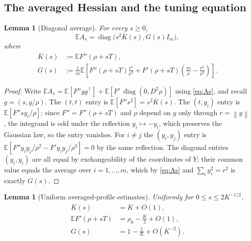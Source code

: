 \documentclass[11pt]{article}
\theoremstyle{plain}
\newtheorem{lemma}[theorem]{Lemma}
\theoremstyle{definition}
\theoremstyle{remark}
\newcommand{\E}{\mathbb{E}}
\newcommand{\diag}{\operatorname{diag}}
\newcommand{\Id}{I}
\newcommand{\1}{\mathbf{1}}
\newcommand{\norm}[1]{\left\lVert #1\right\rVert}
\begin{document}
\subsection{The averaged Hessian and the tuning equation}

\begin{lemma}[Diagonal average]
\label{lem:mean-As}
For every $s\geq0$,
\begin{equation}
    \E A_s
    =
    \diag\bigl(s^2\overline K(s),G(s)\Id_m\bigr),
    \label{eq:mean-As}
\end{equation}
where
\begin{align}
    \overline K(s)
    &:=
    \E F''(\rho+sT),
    \label{eq:barK}\\
    G(s)
    &:=
    \frac1m
    \E\!\left[
        F''(\rho+sT)\frac{r^2}{\rho^2}
        +
        F'(\rho+sT)
        \left(
            \frac m\rho-\frac{r^2}{\rho^3}
        \right)
    \right].
    \label{eq:G-def}
\end{align}
\end{lemma}

\begin{proof}
Write $\E A_s=\E[F''gg^\top]+\E[F'\,\diag(0,D^2\rho)]$ using
\eqref{eq:As}, and recall $g=(s,y/\rho)$. The $(t,t)$ entry is
$\E[F''s^2]=s^2\overline K(s)$. The $(t,y_i)$ entry is
$\E[F''sy_i/\rho]$; since $F''=F''(\rho+sT)$ and $\rho$ depend on $y$ only
through $r=\norm y$, the integrand is odd under the reflection
$y_i\mapsto-y_i$, which preserves the Gaussian law, so the entry vanishes.
For $i\neq j$ the $(y_i,y_j)$ entry is
$\E[F''y_iy_j/\rho^2-F'y_iy_j/\rho^3]=0$ by the same reflection. The diagonal
entries $(y_i,y_i)$ are all equal by exchangeability of the coordinates of
$Y$; their common value equals the average over $i=1,\dots,m$, which by
\eqref{eq:As} and $\sum_i y_i^2=r^2$ is exactly $G(s)$.
\end{proof}

\begin{lemma}[Uniform averaged-profile estimates]
\label{lem:profile-est}
Uniformly for $0\leq s\leq2K^{-1/2}$,
\begin{align}
    \overline K(s)
    &=
    K+O(1),
    \label{eq:barK-est}\\
    \E F'(\rho+sT)
    &=
    \rho_0-\frac K2+O(1),
    \label{eq:Fprime-est}\\
    G(s)
    &=
    1-\frac1K+O(K^{-2}).
    \label{eq:G-est}
\end{align}
\end{lemma}
\end{document}
